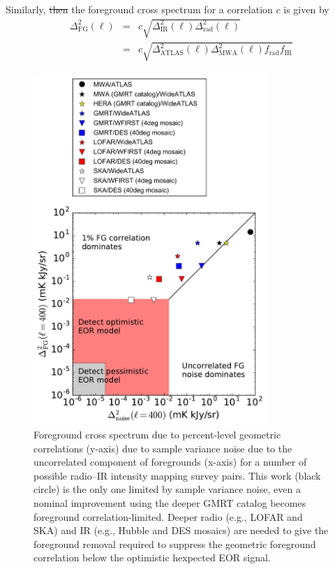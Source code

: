 \documentclass[numberedappendix]{emulateapj}
\newcommand{\rad}{\text{rad}}
\newcommand{\IR}{\text{IR}}
\newcommand{\ir}{\text{IR}}
\providecommand{\DIFdel}[1]{{\protect\color{red}\sout{#1}}}                      %
\providecommand{\DIFdelbegin}{} %
\providecommand{\DIFdelend}{} %
\begin{document}
Similarly, \DIFdelbegin \DIFdel{then }\DIFdelend the foreground cross spectrum for a correlation $c$ is given by
\begin{eqnarray}
\Delta^2_\text{FG}(\ell)& =&c\sqrt{\Delta^2_\IR(\ell) \Delta^2_\rad(\ell)} \nonumber \\
&=&c\sqrt{\Delta^2_{\text{ATLAS}}(\ell) \Delta^2_{\text{MWA}}(\ell)f_\rad f_\ir }
\end{eqnarray}

\begin{figure}[h]
\centering
\includegraphics[width=3.5in]{noise_vs_corr_expt_study.pdf}
\caption[Experimental design study for 21\,cm--Ly$\alpha$ cross spectrum measurements, weighting foreground cross spectra due to flux correlatians against foreground sample variance.]{Foreground cross spectrum due to percent-level geometric correlations (y-axis) due to sample variance noise due to the uncorrelated component of foregrounds (x-axis) for a number of possible radio--IR intensity mapping survey pairs. This work (black circle) is the only one limited by sample variance noise, even a nominal improvement using the deeper GMRT catalog becomes foreground correlation-limited. Deeper radio (e.g., LOFAR and SKA) and IR (e.g., Hubble and DES mosaics) are needed to give the foreground removal required to suppress the geometric foreground correlation below the optimistic hexpected EOR signal.}
\label{fig:noisecorrstudy}
\end{figure}
\end{document}
